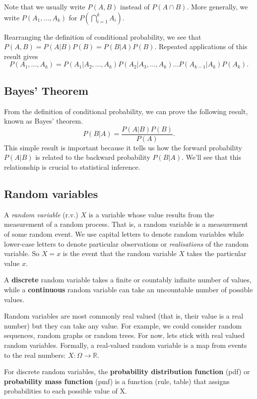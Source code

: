 \documentclass[11pt]{article}
\begin{document}
Note that we usually write $P(A,B)$ instead of $P(A \cap B)$.  More generally, we write $P(A_1,\ldots, A_k) $ for $P(\bigcap_{i = 1}^k A_i)$.

Rearranging the definition of conditional probability, we see that $P(A,B) = P(A|B)P(B) = P(B|A)P(B)$.  Repeated applications of this result gives
\[ P(A_1,\ldots, A_k) = P(A_1|A_2,\ldots, A_k)P(A_2|A_3,\ldots, A_k)\ldots P(A_{k-1}|A_k)P(A_k) . \]

\subsection{Bayes' Theorem}

From the definition of conditional probability, we can prove the following result, known as Bayes' theorem.
\[ P(B|A) = \frac{P(A|B)P(B)}{P(A)}. \]
This simple result is important because it tells us how the forward probability $P(A|B)$ is related to the backward probability $P(B|A)$.   We'll see that this relationship is crucial to statistical inference.


 

\subsection{Random variables}\label{sec:randvars}

A {\em random variable} (r.v.) $X$ is a variable whose value results from the measurement of a random process.   That is, a random variable is a measurement of some random event.  We use capital letters to denote random variables while lower-case letters to denote particular observations or {\em realisations} of the random variable.  So $X = x$ is the event that the random variable $X$ takes the particular value $x$.

A {\bf discrete} random variable takes a finite or countably infinite number of values, while a {\bf continuous} random variable can take an uncountable number of possible values.   

Random variables are most commonly real valued (that is, their value is a real number) but they can take any value.  For example, we could consider random sequences, random graphs or random trees.  For now, lets stick with real valued random variables.   Formally, a real-valued random variable  is a map from events to the real numbers:  $X:\Omega \rightarrow \mathbb R$.



For discrete random variables, the {\bf probability distribution function} (pdf) or {\bf probability mass function} (pmf) is a function (rule, table) that assigns probabilities to each possible value of X.
\end{document}
